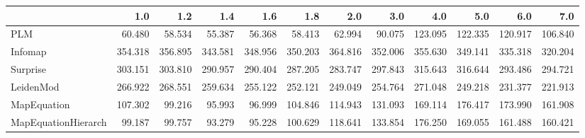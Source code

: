 \begin{tabular}{lrrrrrrrrrrr}
\toprule
{} &     1.0 &     1.2 &     1.4 &     1.6 &     1.8 &     2.0 &     3.0 &     4.0 &     5.0 &     6.0 &     7.0 \\
\midrule
PLM                 &  60.480 &  58.534 &  55.387 &  56.368 &  58.413 &  62.994 &  90.075 & 123.095 & 122.335 & 120.917 & 106.840 \\
Infomap             & 354.318 & 356.895 & 343.581 & 348.956 & 350.203 & 364.816 & 352.006 & 355.630 & 349.141 & 335.318 & 320.204 \\
Surprise            & 303.151 & 303.810 & 290.957 & 290.404 & 287.205 & 283.747 & 297.843 & 315.643 & 316.644 & 293.486 & 294.721 \\
LeidenMod           & 266.922 & 268.551 & 259.634 & 255.122 & 252.121 & 249.049 & 254.764 & 271.048 & 249.218 & 231.377 & 221.913 \\
MapEquation         & 107.302 &  99.216 &  95.993 &  96.999 & 104.846 & 114.943 & 131.093 & 169.114 & 176.417 & 173.990 & 161.908 \\
MapEquationHierarch &  99.187 &  99.757 &  93.279 &  95.228 & 100.629 & 118.641 & 133.854 & 176.250 & 169.055 & 161.488 & 160.421 \\
\bottomrule
\end{tabular}
